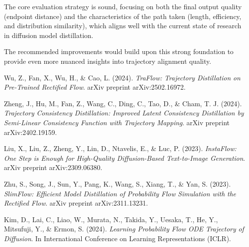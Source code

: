 \documentclass{article}
\begin{document}
The core evaluation strategy is sound, focusing on both the final output quality (endpoint distance) and the characteristics of the path taken (length, efficiency, and distribution similarity), which aligns well with the current state of research in diffusion model distillation.

The recommended improvements would build upon this strong foundation to provide even more nuanced insights into trajectory alignment quality.

\begin{thebibliography}{9}

Wu, Z., Fan, X., Wu, H., \& Cao, L. (2024).
\textit{TraFlow: Trajectory Distillation on Pre-Trained Rectified Flow}.
arXiv preprint arXiv:2502.16972.

Zheng, J., Hu, M., Fan, Z., Wang, C., Ding, C., Tao, D., \& Cham, T. J. (2024).
\textit{Trajectory Consistency Distillation: Improved Latent Consistency Distillation by Semi-Linear Consistency Function with Trajectory Mapping}.
arXiv preprint arXiv:2402.19159.

Liu, X., Liu, Z., Zheng, Y., Lin, D., Ntavelis, E., & Luc, P. (2023).
\textit{InstaFlow: One Step is Enough for High-Quality Diffusion-Based Text-to-Image Generation}.
arXiv preprint arXiv:2309.06380.

Zhu, S., Song, J., Sun, Y., Pang, K., Wang, S., Xiang, T., \& Yan, S. (2023).
\textit{SlimFlow: Efficient Model Distillation of Probability Flow Simulation with the Rectified Flow}.
arXiv preprint arXiv:2311.13231.

Kim, D., Lai, C., Liao, W., Murata, N., Takida, Y., Uesaka, T., He, Y., Mitsufuji, Y., \& Ermon, S. (2024).
\textit{Learning Probability Flow ODE Trajectory of Diffusion}.
In International Conference on Learning Representations (ICLR).

\end{thebibliography}
\end{document}

